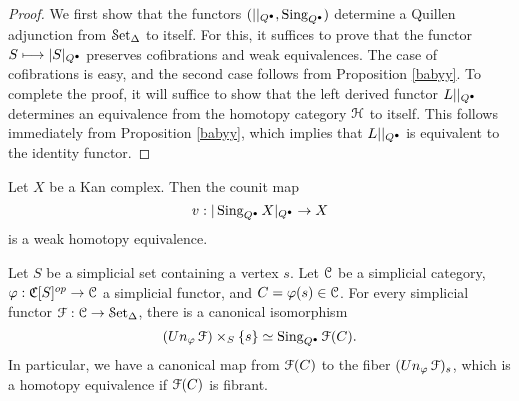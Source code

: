 \begin{proof}
We first show that the functors $( | |_{Q^{\bullet}}, \operatorname{Sing}_{Q^{\bullet}} )$ determine a Quillen adjunction from
$\operatorname{\mathcal{S}et_{\Delta}}$ to itself. For this, it suffices to prove that the functor
$S \longmapsto |S|_{Q^{\bullet}}$
preserves cofibrations and weak equivalences. The case of cofibrations is easy, and the second case follows from Proposition \ref{babyy}.
To complete the proof, it will suffice to show that the left derived functor
$L | |_{Q^{\bullet}}$ determines an equivalence from the homotopy category
$\operatorname{\mathcal{H}}$ to itself. This follows immediately from Proposition \ref{babyy}, which implies
that $L | |_{Q^{\bullet}}$ is equivalent to the identity functor.
\end{proof}

\begin{corollary}\label{remmy33}
Let $X$ be a Kan complex. Then the counit map
$$v: | \operatorname{Sing}_{Q^{\bullet}} X|_{Q^{\bullet}} \rightarrow X$$ is a weak
homotopy equivalence.
\end{corollary}

\begin{remark}\label{undef}
Let $S$ be a simplicial set containing a vertex $s$. Let $\operatorname{\mathcal{C}}$ be a simplicial category,
$\varphi: \operatorname{\mathfrak{C}}[S]^{op} \rightarrow \operatorname{\mathcal{C}}$ a simplicial functor, and $C = \varphi(s) \in \operatorname{\mathcal{C}}$.
For every simplicial functor $\operatorname{\mathcal{F}}: \operatorname{\mathcal{C}} \rightarrow \operatorname{\mathcal{S}et_{\Delta}}$, there is a canonical isomorphism
$$ (Un_{\varphi} \operatorname{\mathcal{F}}) \times_{S} \{s\} \simeq \operatorname{Sing}_{Q^{\bullet}} \operatorname{\mathcal{F}}(C).$$
In particular, we have a canonical map from $\operatorname{\mathcal{F}}(C)$ to the fiber $(Un_{\varphi} \operatorname{\mathcal{F}})_{s}$, which is a homotopy equivalence if $\operatorname{\mathcal{F}}(C)$ is fibrant.
\end{remark}

